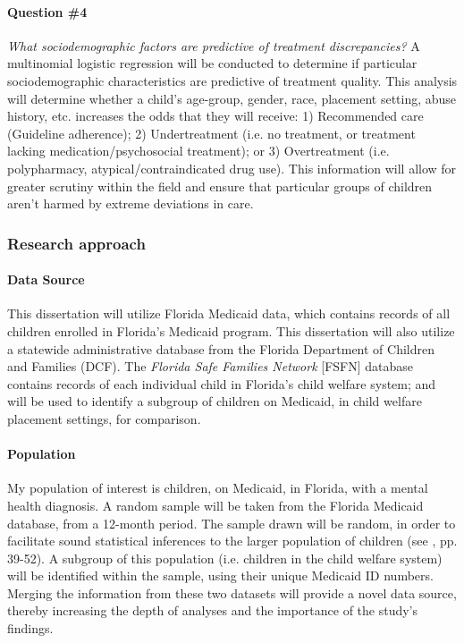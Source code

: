 \documentclass[twocolumn, issue, rga, authordate]{jote-new-article}
\begin{document}
\paragraph{Question \#4} \emph{What sociodemographic factors are
predictive of treatment discrepancies?} A multinomial logistic
regression will be conducted to determine if particular sociodemographic
characteristics are predictive of treatment quality. This analysis will
determine whether a child's age-group, gender, race, placement setting,
abuse history, etc. increases the odds that they will receive: 1)
Recommended care (Guideline adherence); 2) Undertreatment (i.e. no
treatment, or treatment lacking medication/psychosocial treatment); or
3) Overtreatment (i.e. polypharmacy, atypical/contraindicated drug use).
This information will allow for greater scrutiny within the field and
ensure that particular groups of children aren't harmed by extreme
deviations in care.


\subsubsection{Research approach}


\paragraph{Data Source} This dissertation will utilize Florida Medicaid
data, which contains records of all children enrolled in Florida's
Medicaid program. This dissertation will also utilize a statewide
administrative database from the Florida Department of Children and
Families (DCF). The \emph{Florida Safe Families Network} {[}FSFN{]}
database contains records of each individual child in Florida's child
welfare system; and will be used to identify a subgroup of children on
Medicaid, in child welfare placement settings, for comparison.

\paragraph{Population} My population of interest is children, on Medicaid,
in Florida, with a mental health diagnosis. A random sample will be
taken from the Florida Medicaid database, from a 12-month period. The
sample drawn will be random, in order to facilitate sound statistical
inferences to the larger population of children (see  \citeyear{Berk2004}, pp.
39-52). A subgroup of this population (i.e. children in the child
welfare system) will be identified within the sample, using their unique
Medicaid ID numbers. Merging the information from these two datasets
will provide a novel data source, thereby increasing the depth of
analyses and the importance of the study's findings.
\end{document}
